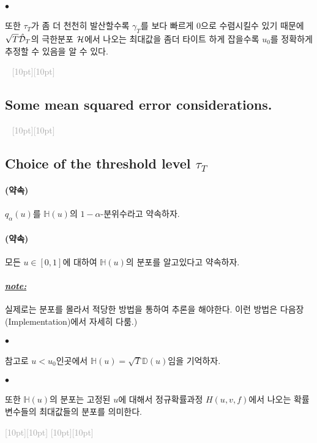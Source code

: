 \documentclass[12pt,oneside,english]{book}
\newcommand{\dash}{\vspace{2em}\noindent \textcolor{darkgray}{\hrulefill~ \raisebox{-2.5pt}[10pt][10pt]{\leafright \decofourleft \decothreeleft  \aldineright \decotwo \floweroneleft \decoone   \floweroneright \decotwo \aldineleft\decothreeright \decofourright \leafleft} ~  \hrulefill \\ \vspace{2em}}}
\newcommand{\rdash}{\noindent \textcolor{darkgray}{ \raisebox{-1.9pt}[10pt][10pt]{\leafright} \hrulefill \raisebox{-1.9pt}[10pt][10pt]{\leafright \decofourleft \decothreeleft  \aldineright \decotwo \floweroneleft \decoone}}}
\def\ck{\paragraph{\large$\bullet$}\large}
\def\promise{\paragraph{\large(약속)}\large}
\def\note{\paragraph{\large\textit{\underline{note:}}}\large}
\begin{document}
\ck 또한 $\tau_T$가 좀 더 천천히 발산할수록 $\gamma_T$를 보다 빠르게 0으로 수렴시킬수 있기 때문에 $\sqrt{T}\hat{\cal D}_T$의 극한분포 $\cal H$에서 나오는 최대값을 좀더 타이트 하게 잡을수록 $u_0$를 정확하게 추정할 수 있음을 알 수 있다. 

\dash 
\subsection{Some mean squared error considerations.}


\dash 

\subsection{Choice of the threshold level $\tau_T$}


\promise $q_{\alpha}(u)$를 $\mathbb{H}(u)$의 $1-\alpha$-분위수라고 약속하자. 

\promise 모든 $u\in [0,1]$에 대하여 $\mathbb{H}(u)$의 분포를 알고있다고 약속하자. 

\note 실제로는 분포를 몰라서 적당한 방법을 통하여 추론을 해야한다. 이런 방법은 다음장(Implementation)에서 자세히 다룸.)

\ck 참고로 $u<u_0$인곳에서 $\mathbb{H}(u)=\sqrt{T}\mathbb{D}(u)$임을 기억하자. 
\ck 또한 $\mathbb{H}(u)$의 분포는 고정된 $u$에 대해서 정규확률과정 $H(u,v,f)$에서 나오는 확률변수들의 최대값들의 분포를 의미한다. 

\rdash 
\end{document}
